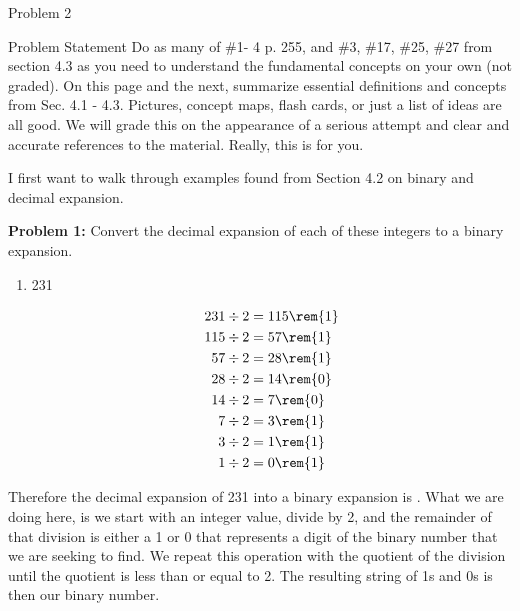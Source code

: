 \begin{problem}{Problem 2}
    \begin{statement}{Problem Statement}
        Do as many of \#1- 4 p. 255, and \#3, \#17, \#25, \#27 from section 4.3 as you need to understand the fundamental concepts on your own (not graded). On this page and the next, summarize 
        essential definitions and concepts from Sec. 4.1 - 4.3. Pictures, concept maps, flash cards, or just a list of ideas are all good. We will grade this on the appearance of a serious attempt 
        and clear and accurate references to the material. Really, this is for you.
    \end{statement}

    \begin{highlight}[Solution]
        I first want to walk through examples found from Section 4.2 on binary and decimal expansion. \vspace*{1em}

        \noindent \textbf{Problem 1:} Convert the decimal expansion of each of these integers to a binary expansion.

        \begin{enumerate}[label = (\alph*)]
            \item 231
            
            \begin{align*}
                231 \div 2 & = 115 \rem{1} \\
                115 \div 2 & = 57 \rem{1} \\
                57 \div 2 & = 28 \rem{1} \\
                28 \div 2 & = 14 \rem{0} \\
                14 \div 2 & = 7 \rem{0} \\
                7 \div 2 & = 3 \rem{1} \\
                3 \div 2 & = 1 \rem{1} \\
                1 \div 2 & = 0 \rem{1}
            \end{align*}
        \end{enumerate}
        Therefore the decimal expansion of 231 into a binary expansion is . What we are doing here, is we start with an integer value, divide by 2, and the remainder of that division
        is either a 1 or 0 that represents a digit of the binary number that we are seeking to find. We repeat this operation with the quotient of the division until the quotient is less than or
        equal to 2. The resulting string of 1s and 0s is then our binary number. \vspace*{1em}


\end{highlight}
\end{problem}
